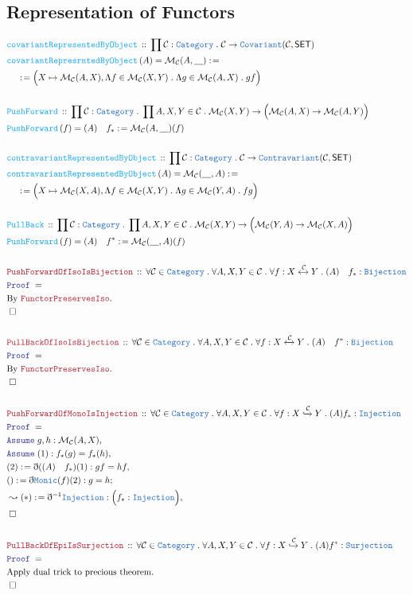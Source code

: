\documentclass[12pt]{scrartcl}
\newcommand{\TYPE}[1]{\textcolor{NavyBlue}{\mathtt{#1}}}
\newcommand{\FUNC}[1]{\textcolor{Cerulean}{\mathtt{#1}}}
\newcommand{\LOGIC}[1]{\textcolor{Blue}{\mathtt{#1}}}
\newcommand{\THM}[1]{\textcolor{Maroon}{\mathtt{#1}}}
\renewcommand{\.}{\; . \;}
\newcommand{\de}{: \kern 0.1pc =}
\newcommand{\Act}[1]{\left( #1 \right)}
\newcommand{\Theorem}[2]{& \THM{#1} \, :: \, #2 \\ & \Proof = \\ }
\newcommand{\DeclareFunc}[2]{& \FUNC{#1} \, :: \, #2 \\}
\newcommand{\DefineNamedFunc}[4]{&  \FUNC{#1}\Act{#2} = #3 \de #4 \\}
\newcommand{\NewLine}{\\ & \kern 1pc}
\newcommand{\Page}[1]{ \begin{align*} #1 \end{align*}   }
\newcommand{ \bd }{ \ByDef }
\newcommand{\Cat}{\TYPE{Category}}
\newcommand{\Mor}{\mathcal{M}}
\newcommand{\ToMono}{\xhookrightarrow}
\newcommand{\ToIso}{\xleftrightarrow}
\newcommand{\Say}[3]{& #1 \de #2 : #3, \\}
\newcommand{\Conclude}[3]{& #1 \de #2 : #3; \\}
\newcommand{\Derive}[3]{& \leadsto #1 \de #2 : #3, \\}
\newcommand{\Assume}[2]{& \LOGIC{Assume} \; #1 : #2, \\}
\newcommand{\QED}{\; \square}
\newcommand{\EndProof}{& \QED \\}
\newcommand{\ByDef}{\eth}
\newcommand{\Proof}{\LOGIC{Proof} \; }
\newcommand{\Cov}{\TYPE{Covariant}}
\newcommand{\Contra}{\TYPE{Contravariant}}
\newcommand{\C}{\mathcal{C}}
\newcommand{\SET}{\mathsf{SET}}
\begin{document}
\subsection{Representation of Functors}
\Page{
	\DeclareFunc{covariantRepresentedByObject}{\prod \C : \Cat \. \C \to \Cov(\C,\SET)}
	\DefineNamedFunc{covariantRepresrntedByObject}{A}{ \Mor_\C(A,\underline{\quad}) }{
		\NewLine \de
		\Big( X \mapsto \Mor_\C(A,X) , \Lambda f \in \Mor_\C(X,Y) \. \Lambda g \in \Mor_\C(A,X) \. gf \Big)	
	}
	\\
	\DeclareFunc{PushForward}{\prod \C : \Cat \. \prod A,X,Y \in \C \. \Mor_\C(X,Y) \to \Big(\Mor_\C(A,X) \to \Mor_\C(A,Y)\Big)}
	\DefineNamedFunc{PushForward}{f}{(A) \quad f_*}{\Mor_\C(A,\underline{\quad})(f)}
	\\
	\DeclareFunc{contravariantRepresentedByObject}{\prod \C : \Cat \. \C \to \Contra(\C,\SET)}
	\DefineNamedFunc{contravariantRepresentedByObject}{A}{ \Mor_\C(\underline{\quad},A) }{
		\NewLine \de
		\Big( X \mapsto \Mor_\C(X,A) , \Lambda f \in \Mor_\C(X,Y) \. \Lambda g \in \Mor_\C(Y,A) \. fg \Big)	
	}
	\\
	\DeclareFunc{PullBack}{\prod \C : \Cat \. \prod A,X,Y \in \C \. \Mor_\C(X,Y) \to \Big(\Mor_\C(Y,A) \to \Mor_\C(X,A)\Big)}
	\DefineNamedFunc{PushForward}{f}{(A) \quad f^*}{\Mor_\C(\underline{\quad},A)(f)}
	\\
	\Theorem{PushForwardOfIsoIsBijection}{\forall \C \in \Cat \. \forall A,X,Y \in \C \. 
		\forall f : X \ToIso{\C} Y \. (A) \quad f_* : \TYPE{Bijection}}
	& \text{By $\THM{FunctorPreservesIso}$.} \\
	\EndProof
	\\
	\Theorem{PullBackOfIsoIsBijection}{\forall \C \in \Cat \. \forall A,X,Y \in \C \. 
		\forall f : X \ToIso{\C} Y \. (A) \quad f^* : \TYPE{Bijection}}
	& \text{By $\THM{FunctorPreservesIso}$.} \\
	\EndProof
	\\
	\Theorem{PushForwardOfMonoIsInjection}{\forall \C \in \Cat \. \forall A,X,Y \in \C \. 
		\forall f : X \ToMono{\C} Y \. (A)f_* : \TYPE{Injection}}
	\Assume{g,h}{\Mor_{\C}(A,X)}
	\Assume{(1)}{f_*(g) = f_*(h)}
	\Say{(2)}{\bd ((A) \quad f_*)(1) }{  gf = hf  }
	\Conclude{()}{\bd \TYPE{Monic}(f)(2)}{ g = h  }
	\Derive{(*)}{\bd^{-1} \TYPE{Injection}}{ \Big( f_* : \TYPE{Injection} \Big) }
	\EndProof
	\\
	\Theorem{PullBackOfEpiIsSurjection}{\forall \C \in \Cat \. \forall A,X,Y \in \C \. 
		\forall f : X \ToMono{\C} Y \. (A) f^* : \TYPE{Surjection}}
	& \text{Apply dual trick to precious theorem.}\\
	\EndProof
}
\end{document}
